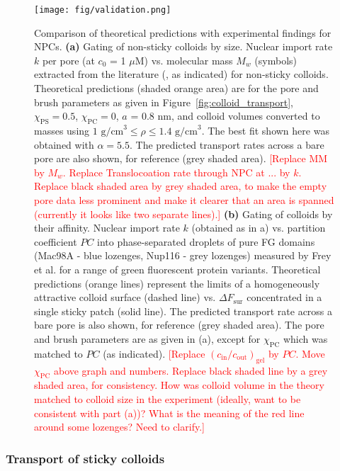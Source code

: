 \documentclass[12pt, a4paper]{article}
\newcommand\todo[1]{\textcolor{red}{#1}}
\begin{document}
\begin{figure}
    \centering
    \centerline{\texttt{[image: fig/validation.png]}}
    \caption{
    Comparison of theoretical predictions with experimental findings for NPCs.
    \textbf{(a)} 
    Gating of non-sticky colloids by size.
    Nuclear import rate $k$ per pore (at $c_0$ = 1 $\mu$M) vs. molecular mass $M_w$ (symbols) extracted from the literature (\cite{Ribbeck2001, Mohr2009, Popken2015, Timney2016, Frey2018}, as indicated) for non-sticky colloids.
    Theoretical predictions (shaded orange area) are for the pore and brush parameters as given in Figure~\ref{fig:colloid_transport}, $\chi_{\text{PS}} = 0.5$, $\chi_{\text{PC}} = 0$, $a$ = 0.8 nm, and colloid volumes converted to masses using $\text{1 g/cm}^3 \leq \rho \leq \text{1.4 g/cm}^3$.
    The best fit shown here was obtained with $\alpha = 5.5$.
    The predicted transport rates across a bare pore are also shown, for reference (grey shaded area).
    \todo{[Replace MM by $M_w$. Replace Translocoation rate through NPC at ... by $k$. Replace black shaded area by grey shaded area, to make the empty pore data less prominent and make it clearer that an area is spanned (currently it looks like two separate lines).]}
    \textbf{(b)} 
    Gating of colloids by their affinity.
    Nuclear import rate $k$ (obtained as in a) vs. partition coefficient $PC$ into phase-separated droplets of pure FG domains (Mac98A - blue lozenges, Nup116 - grey lozenges) measured by Frey et al. \cite{Frey2018} for a range of green fluorescent protein variants.
    Theoretical predictions (orange lines) represent the limits of a homogeneously attractive colloid surface (dashed line) vs. $\Delta F_\text{sur}$ concentrated in a single sticky patch (solid line).
    The predicted transport rate across a bare pore is also shown, for reference (grey shaded area).
    The pore and brush parameters are as given in (a), except for $\chi_\text{PC}$ which was matched to $PC$ (as indicated).
    \todo{[Replace $\left(c_{\text{in}}/c_{\text{out}}\right)_{\text{gel}}$ by $PC$. Move $\chi_{\text{PC}}$ above graph and numbers. Replace black shaded line by a grey shaded area, for consistency.
    How was colloid volume in the theory matched to colloid size in the experiment (ideally, want to be consistent with part (a))? What is the meaning of the red line around some lozenges? Need to clarify.]}
    }
    \label{fig:NPC_comparison}
\end{figure}


\subsubsection{Transport of sticky colloids}
\end{document}
